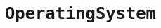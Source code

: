 \newpage
\chapter{\tt Operating\space System}
\thispagestyle{fancy}	
\section[\tt Linux]{\color{blue}{\tt Linux}}
\subsection[{\tt Linux}常见命令]{}
